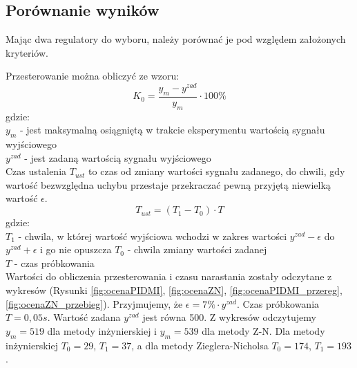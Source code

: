 \documentclass[a4paper, 10pt]{article}
\begin{document}
\subsection{Porównanie wyników} \label{porownaj}
Mając dwa regulatory do wyboru, należy porównać je pod względem założonych kryteriów.

Przesterowanie można obliczyć ze wzoru:
\[K_0=\frac{y_{m}-y^{zad}}{y_{m}}\cdot 100\%\]
gdzie: \\
$y_{m}$ - jest maksymalną osiągniętą w trakcie eksperymentu wartością sygnału wyjściowego\\
$y^{zad}$ - jest zadaną wartością sygnału wyjściowego\\

Czas ustalenia $T_{ust}$ to czas od zmiany wartości sygnału zadanego, do chwili, gdy wartość  bezwzględna  uchybu  przestaje  przekraczać  pewną  przyjętą  niewielką  wartość $\epsilon$. \\
\[T_{ust}=(T_1-T_0)\cdot T\]
gdzie: \\
$T_1$ - chwila, w której wartość wyjściowa wchodzi w zakres wartości $y^{zad}-\epsilon$ do $y^{zad}+\epsilon$ i go nie opuszcza
$T_0$ - chwila zmiany wartości zadanej\\
$T$ - czas próbkowania\\

Wartości do obliczenia przesterowania i czasu narastania zostały odczytane z wykresów (Rysunki \ref{fig:ocenaPIDMI}, \ref{fig:ocenaZN}, \ref{fig:ocenaPIDMI_przereg},  \ref{fig:ocenaZN_przebieg}). Przyjmujemy, że $\epsilon = 7\% \cdot y^{zad}$. Czas próbkowania $T = 0,05s$. Wartość zadana $y^{zad}$ jest równa 500. Z wykresów odczytujemy $y_{m} = 519$ dla metody inżynierskiej i  $y_{m} = 539$ dla metody Z-N. Dla metody inżynierskiej $T_0 = 29$, $T_1 = 37$, a dla metody Zieglera-Nicholsa $T_0 = 174$, $T_1 = 193$.
\end{document}
